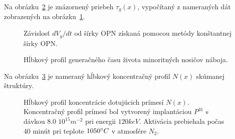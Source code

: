 Na obrázku~\ref{fig:3.6} je znázornený priebeh $\tau_g(x)$, vypočítaný
z nameraných dát zobrazených na obrázku~\ref{fig:3.5}.

\begin{figure}[h!]\centering
  
  \caption[Závislosť ${dV_g}/{dt}$ od šírky OPN získaná pomocou
    metódy konštantnej šírky OPN]{Závislosť ${dV_g}/{dt}$ od šírky
    OPN získaná pomocou metódy konštantnej šírky OPN.}\label{fig:3.5}
\end{figure}

\begin{figure}[h!]\centering
  
  \caption[Hĺbkový profil generačného času života minoritných nosičov
  náboja]{Hĺbkový profil generačného času života minoritných nosičov
  náboja.}\label{fig:3.6}
\end{figure}

Na obrázku~\ref{fig:3.7} je nameraný hĺbkový koncentračný profil
$N(x)$ skúmanej štruktúry.

\begin{figure}[h!]\centering
  
  \caption[Hĺbkový profil koncentrácie dotujúcich prímesí
  $N(x)$]{Hĺbkový profil koncentrácie dotujúcich prímesí
  $N(x)$. Koncentračný profil prímesí bol vytvorený implantáciou
  $P^{31}$ s dávkou $8.0$ $10^{15}m^{-2}$ pri energii $120 keV$.
  Aktivácia prebiehala počas 40 minút pri teplote $1050 \degree C$ v
  atmosfére $N_2$.}\label{fig:3.7}
\end{figure}


